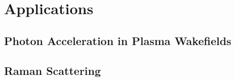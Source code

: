 \newpage
\section{Applications}

\subsection{Photon Acceleration in Plasma Wakefields}
\subsection{Raman Scattering}
